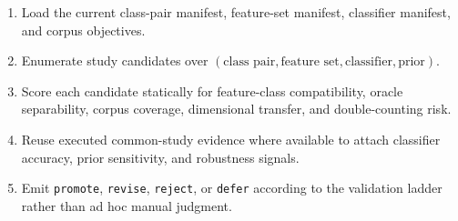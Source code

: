 \begin{enumerate}
  \item Load the current class-pair manifest, feature-set manifest, classifier manifest, and corpus objectives.
  \item Enumerate study candidates over $(\text{class pair}, \text{feature set}, \text{classifier}, \text{prior})$.
  \item Score each candidate statically for feature-class compatibility, oracle separability, corpus coverage, dimensional transfer, and double-counting risk.
  \item Reuse executed common-study evidence where available to attach classifier accuracy, prior sensitivity, and robustness signals.
  \item Emit \texttt{promote}, \texttt{revise}, \texttt{reject}, or \texttt{defer} according to the validation ladder rather than ad hoc manual judgment.
\end{enumerate}